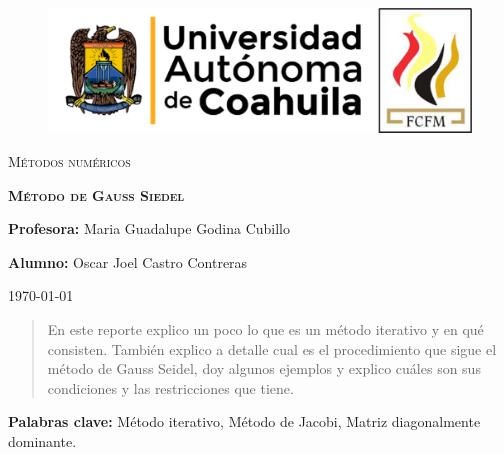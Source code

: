 \documentclass[12pt]{article}
\begin{document}
		
		\begin{titlepage}
		
			\centering
			{\bfseries
			\begin{figure}[h!]
				\centering
				\includegraphics[width=\linewidth]{Nom_UAdeC_FCFM.png} 				
			\end{figure}
			\par}
			\vspace{2cm}
			{\scshape\LARGE Métodos numéricos \par}
			\vspace{3cm}
			{\scshape\Huge \textbf{Método de Gauss Siedel} \par}
			\vfill
			{\LARGE \textbf{Profesora:} Maria Guadalupe Godina Cubillo \par}
			\vspace{3cm}
			{\LARGE \textbf{Alumno:} Oscar Joel Castro Contreras \par}
			\vfill
			{\Large \today \par}
			\thispagestyle{empty}
			
		\end{titlepage}
	
		\newpage

		\begin{abstract}
			\noindent En este reporte explico un poco lo que es un método iterativo y en qué consisten. También explico 
			a detalle cual es el procedimiento que sigue el método de Gauss Seidel, doy algunos ejemplos y 
			explico cuáles son sus condiciones y las restricciones que tiene.
			
		\end{abstract}

          \textbf{Palabras clave:} Método iterativo, Método de Jacobi, Matriz diagonalmente dominante.
\end{document}
